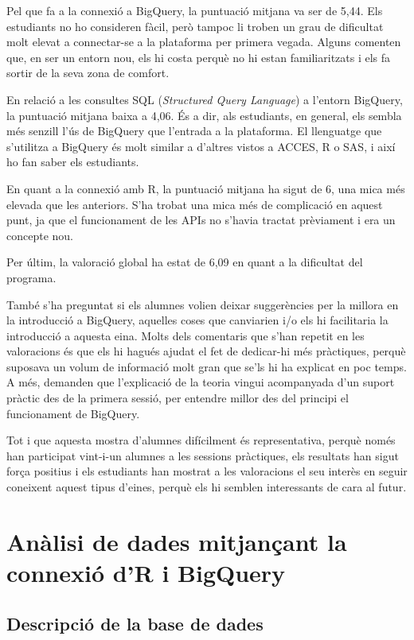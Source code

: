\documentclass[12pt,longbibliography]{article}
\theoremstyle{definition}
\theoremstyle{remark}
\begin{document}
Pel que fa a la connexió a BigQuery, la puntuació mitjana va ser de 5,44. Els estudiants no ho consideren fàcil, però tampoc li troben un grau de dificultat molt elevat a connectar-se a la plataforma per primera vegada. Alguns comenten que, en ser un entorn nou, els hi costa perquè no hi estan familiaritzats i els fa sortir de la seva zona de comfort.


En relació a les consultes SQL (\textit{Structured Query Language}) a l'entorn BigQuery, la puntuació mitjana baixa a 4,06. És a dir, als estudiants, en general, els sembla més senzill l'ús de BigQuery que l'entrada a la plataforma. El llenguatge que s'utilitza a BigQuery és molt similar a d'altres vistos a ACCES, R o SAS, i així ho fan saber els estudiants.


En quant a la connexió amb R, la puntuació mitjana ha sigut de 6, una mica més elevada que les anteriors. S'ha trobat una mica més de complicació en aquest punt, ja que el funcionament de les APIs no s'havia tractat prèviament i era un concepte nou.


Per últim, la valoració global ha estat de 6,09 en quant a la dificultat del programa.


També s'ha preguntat si els alumnes volien deixar suggerències per la millora en la introducció a BigQuery, aquelles coses que canviarien i/o els hi facilitaria la introducció a aquesta eina. Molts dels comentaris que s'han repetit en les valoracions és que els hi hagués ajudat el fet de dedicar-hi més pràctiques, perquè suposava un volum de informació molt gran que se'ls hi ha explicat en poc temps. A més, demanden que l'explicació de la teoria vingui acompanyada d'un suport pràctic des de la primera sessió, per entendre millor des del principi el funcionament de BigQuery.


Tot i que aquesta mostra d'alumnes difícilment és representativa, perquè només han participat vint-i-un alumnes a les sessions pràctiques, els resultats han sigut força positius i els estudiants han mostrat a les valoracions el seu interès en seguir coneixent aquest tipus d'eines, perquè els hi semblen interessants de cara al futur.


\newpage

\section{Anàlisi de dades mitjançant la connexió d'R i BigQuery}

\subsection{Descripció de la base de dades}
\end{document}
